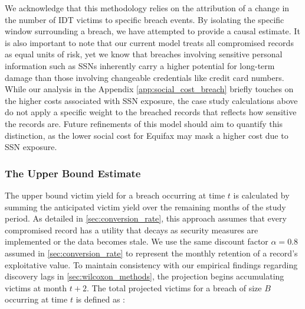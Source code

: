 


We acknowledge that this methodology relies on the attribution of a change in the number of IDT victims to specific breach events. By isolating the specific window surrounding a breach, we have attempted to provide a  causal estimate. It is also important to note that our current model treats all compromised records as equal units of risk, yet we know that breaches involving sensitive personal information such as SSNs inherently carry a higher potential for long-term damage than those involving changeable credentials like credit card numbers. While our analysis in the Appendix \ref{app:social_cost_breach} briefly touches on the higher costs associated with SSN exposure, the case study calculations above do not apply a specific weight to the breached records that reflects how sensitive the records are. Future refinements of this model should aim to quantify this distinction, as the lower social cost for Equifax may mask a higher cost due to SSN exposure.


\subsubsection{The Upper Bound Estimate}
The upper bound victim yield for a breach occurring at time $t$ is calculated by summing the anticipated victim yield over the remaining months of the study period. As detailed in \ref{sec:conversion_rate}, this approach assumes that every compromised record has a utility that decays as security measures are implemented or the data becomes stale. We use the same discount factor $\alpha = 0.8$ assumed in \ref{sec:conversion_rate} to represent the monthly retention of a record's exploitative value. To maintain consistency with our empirical findings regarding discovery lags in \ref{sec:wilcoxon_methods}, the projection begins accumulating victims at month $t+2$. The total projected victims for a breach of size $B$ occurring at time $t$ is defined as : 

